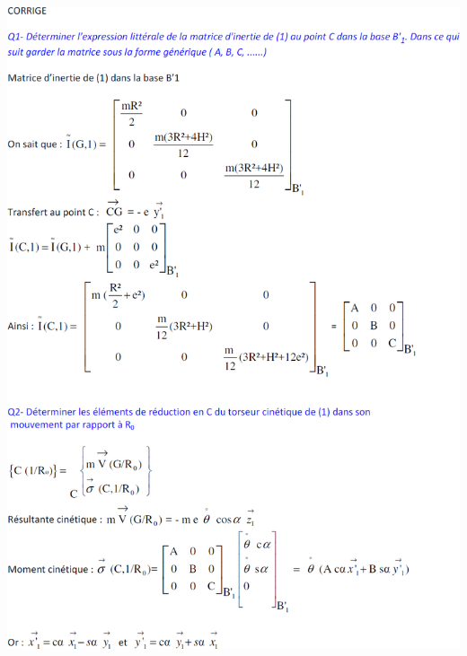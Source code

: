 \documentclass[10pt,fleqn]{article} %
\begin{document}
\begin{center}
\includegraphics[width=\linewidth]{images/cor_01}
\end{center}
\end{document}
